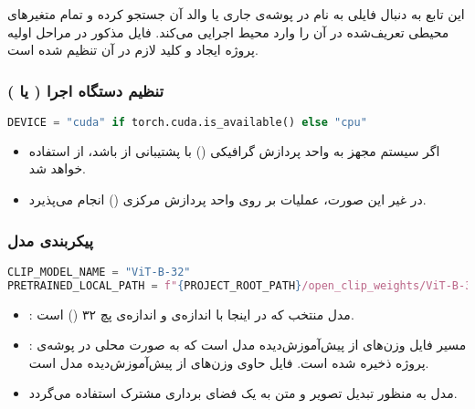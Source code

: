 \documentclass{article}
\begin{document}
این تابع به دنبال فایلی به نام  در پوشه‌ی جاری یا والد آن جستجو کرده و تمام متغیرهای محیطی تعریف‌شده در آن را وارد محیط اجرایی می‌کند. فایل مذکور در مراحل اولیه پروژه ایجاد و کلید  لازم در آن تنظیم شده است.

\subsubsection{تنظیم دستگاه اجرا ( یا )}

\begin{latin}
\begin{lstlisting}[language=Python]
DEVICE = "cuda" if torch.cuda.is_available() else "cpu"
\end{lstlisting}
\end{latin}

\begin{itemize}
    \item اگر سیستم مجهز به واحد پردازش گرافیکی () با پشتیبانی از  باشد، از  استفاده خواهد شد.
    \item در غیر این صورت، عملیات بر روی واحد پردازش مرکزی () انجام می‌پذیرد.
\end{itemize}

\subsubsection{پیکربندی مدل }

\begin{latin}
\begin{lstlisting}[language=Python]
CLIP_MODEL_NAME = "ViT-B-32"
PRETRAINED_LOCAL_PATH = f"{PROJECT_ROOT_PATH}/open_clip_weights/ViT-B-32-openai/open_clip_model.safetensors"
\end{lstlisting}
\end{latin}

\begin{itemize}
    \item {}: مدل  منتخب که در اینجا  با اندازه‌ی  و اندازه‌ی پچ ۳۲ () است.
    \item {}: مسیر فایل وزن‌های از پیش‌آموزش‌دیده مدل است که به صورت محلی در پوشه‌ی پروژه ذخیره شده است. فایل  حاوی وزن‌های از پیش‌آموزش‌دیده مدل است.
    \item مدل  به منظور تبدیل تصویر و متن به یک فضای برداری مشترک استفاده می‌گردد.
\end{itemize}
\end{document}
